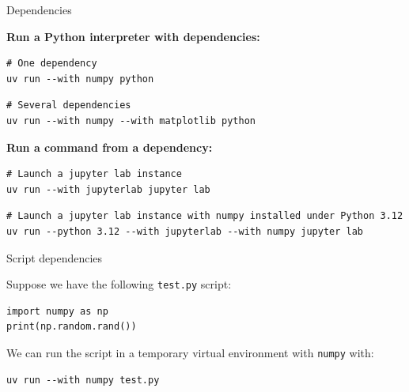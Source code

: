 \documentclass[aspectratio=169,xcolor=dvipsnames,svgnames,x11names,fleqn]{beamer}
\begin{document}
\begin{frame}[containsverbatim]{Dependencies}

    \textbf{Run a Python interpreter with dependencies:}
    \begin{verbatim}
# One dependency
uv run --with numpy python
    \end{verbatim}
    \begin{verbatim}
# Several dependencies
uv run --with numpy --with matplotlib python
    \end{verbatim}

    \bigskip
    \textbf{Run a command from a dependency:}
    \begin{verbatim}
# Launch a jupyter lab instance
uv run --with jupyterlab jupyter lab
    \end{verbatim}
    \begin{verbatim}
# Launch a jupyter lab instance with numpy installed under Python 3.12
uv run --python 3.12 --with jupyterlab --with numpy jupyter lab
    \end{verbatim}

\end{frame}

\begin{frame}[containsverbatim]{Script dependencies}

    Suppose we have the following \texttt{test.py} script:
    \begin{verbatim}
import numpy as np
print(np.random.rand())
    \end{verbatim}

    We can run the script in a temporary virtual environment with \texttt{numpy} with:
    \begin{verbatim}
uv run --with numpy test.py
    \end{verbatim}

\end{frame}
\end{document}
